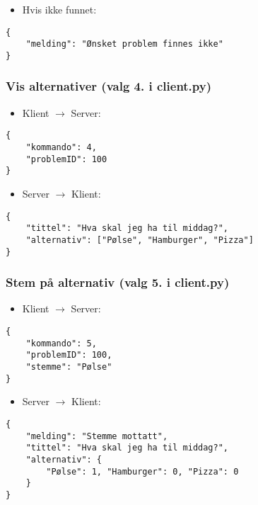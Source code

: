 \documentclass[hidelinks]{article}
\begin{document}
\begin{itemize}
    \item Hvis ikke funnet:
\end{itemize}

\begin{verbatim}
{
    "melding": "Ønsket problem finnes ikke"
}
\end{verbatim}

\newpage

\subsubsection{Vis alternativer (valg 4. i client.py)}

\begin{itemize}
    \item Klient \(\rightarrow\) Server:
\end{itemize}

\begin{verbatim}
{
    "kommando": 4,
    "problemID": 100
}
\end{verbatim}

\begin{itemize}
    \item Server \(\rightarrow\) Klient:
\end{itemize}

\begin{verbatim}
{
    "tittel": "Hva skal jeg ha til middag?",
    "alternativ": ["Pølse", "Hamburger", "Pizza"]
}
\end{verbatim}

\subsubsection{Stem på alternativ (valg 5. i client.py)}

\begin{itemize}
    \item Klient \(\rightarrow\) Server:
\end{itemize}

\begin{verbatim}
{
    "kommando": 5,
    "problemID": 100,
    "stemme": "Pølse"
}
\end{verbatim}

\begin{itemize}
    \item Server \(\rightarrow\) Klient:
\end{itemize}

\begin{verbatim}
{
    "melding": "Stemme mottatt",
    "tittel": "Hva skal jeg ha til middag?",
    "alternativ": {
        "Pølse": 1, "Hamburger": 0, "Pizza": 0
    }
}
\end{verbatim}
\end{document}
